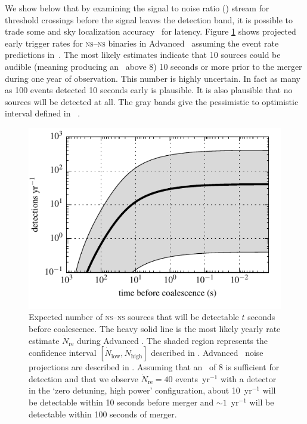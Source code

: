 We show below that by examining the signal to noise ratio (\SNR{}) stream for
threshold crossings before the \GW{} signal leaves the detection band, it is
possible to trade some \SNR{} and sky localization
accuracy~\cite{Fairhurst2009} for latency.  Figure \ref{fig:earlywarning} shows
projected early trigger rates for \textsc{ns}--\textsc{ns} binaries in Advanced
\LIGO\ assuming the event rate predictions in~\cite{Abadie:2010p10836}.  The
most likely estimates indicate that 10 sources could be audible (meaning
producing an \SNR\ above 8) 10 seconds or more prior to the merger during one
year of observation.  This number is highly uncertain.  In fact as many as 100
events detected 10 seconds early is plausible. It is also plausible that no
sources will be detected at all.  The gray bands give the pessimistic to
optimistic interval defined in ~\cite{Abadie:2010p10836}. 
%
\begin{figure}
\begin{center}
\includegraphics{figures/snr_in_time.pdf}
\caption{\label{fig:earlywarning} Expected number of \textsc{ns}--\textsc{ns}
sources that will be detectable $t$ seconds before coalescence.  The heavy
solid line is the most likely yearly rate estimate $\dot N_{\mathrm{re}}$
during Advanced \LIGO.  The shaded region represents the confidence interval
$[\dot N_{\mathrm{low}}, \dot N_{\mathrm{high}}]$ described in
\cite{Abadie:2010p10836}.  Advanced \LIGO\ noise projections are described in
\cite{ALIGONoise}.  Assuming that an \SNR\ of 8 is sufficient for detection and
that we observe $\dot N_{\mathrm{re}} = 40$ events~yr$^{-1}$ with a detector in
the `zero detuning, high power' configuration, about 10~yr$^{-1}$ will be
detectable within 10 seconds before merger and $\sim1$~yr$^{-1}$ will be
detectable within 100 seconds of merger.} 
\end{center}
\end{figure}

